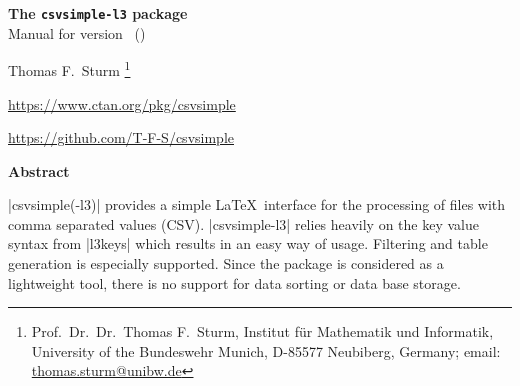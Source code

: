 \documentclass[a4paper,11pt]{ltxdoc}
\begin{document}
\begin{center}
\begin{tcolorbox}[enhanced,hbox,tikznode,left=8mm,right=8mm,boxrule=0.4pt,
  colback=white,colframe=black!50!yellow,
  drop lifted shadow=black!50!yellow,arc is angular,
  before=\par\vspace*{5mm},after=\par\bigskip]
{\bfseries\LARGE The \texttt{csvsimple-l3} package}\\[3mm]
{\large Manual for version \version\ (\datum)}
\end{tcolorbox}
{\large Thomas F.~Sturm%
  \footnote{Prof.~Dr.~Dr.~Thomas F.~Sturm, Institut f\"{u}r Mathematik und Informatik,
    University of the Bundeswehr Munich, D-85577 Neubiberg, Germany;
    email: \href{mailto:thomas.sturm@unibw.de}{thomas.sturm@unibw.de}}\par\medskip
\normalsize\url{https://www.ctan.org/pkg/csvsimple}\par
\url{https://github.com/T-F-S/csvsimple}
}
\end{center}
\bigskip
\begin{absquote}
  \begin{center}\bfseries Abstract\end{center}
  |csvsimple(-l3)| provides a simple \LaTeX\ interface for the processing of files with
  comma separated values (CSV). |csvsimple-l3| relies heavily on the key value
  syntax from |l3keys| which results in an easy way of usage.
  Filtering and table generation is especially supported. Since the package
  is considered as a lightweight tool, there is no support for data sorting
  or data base storage.
\end{absquote}

\vspace{1cm}
\end{document}
